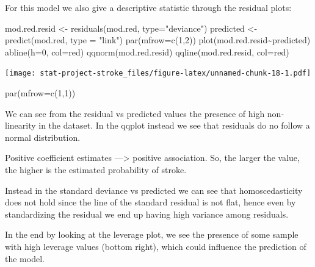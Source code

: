 \documentclass[
]{article}
\newenvironment{Shaded}{\begin{snugshade}}{\end{snugshade}}
\newcommand{\AttributeTok}[1]{\textcolor[rgb]{0.77,0.63,0.00}{#1}}
\newcommand{\DecValTok}[1]{\textcolor[rgb]{0.00,0.00,0.81}{#1}}
\newcommand{\FunctionTok}[1]{\textcolor[rgb]{0.00,0.00,0.00}{#1}}
\newcommand{\NormalTok}[1]{#1}
\newcommand{\OtherTok}[1]{\textcolor[rgb]{0.56,0.35,0.01}{#1}}
\newcommand{\SpecialCharTok}[1]{\textcolor[rgb]{0.00,0.00,0.00}{#1}}
\newcommand{\StringTok}[1]{\textcolor[rgb]{0.31,0.60,0.02}{#1}}
\begin{document}
For this model we also give a descriptive statistic through the residual
plots:

\begin{Shaded}
\begin{Highlighting}[]
\NormalTok{mod.red.resid }\OtherTok{\textless{}{-}} \FunctionTok{residuals}\NormalTok{(mod.red, }\AttributeTok{type=}\StringTok{"deviance"}\NormalTok{)}
\NormalTok{predicted }\OtherTok{\textless{}{-}} \FunctionTok{predict}\NormalTok{(mod.red, }\AttributeTok{type =} \StringTok{"link"}\NormalTok{)}
\FunctionTok{par}\NormalTok{(}\AttributeTok{mfrow=}\FunctionTok{c}\NormalTok{(}\DecValTok{1}\NormalTok{,}\DecValTok{2}\NormalTok{))}
\FunctionTok{plot}\NormalTok{(mod.red.resid}\SpecialCharTok{\textasciitilde{}}\NormalTok{predicted)}
\FunctionTok{abline}\NormalTok{(}\AttributeTok{h=}\DecValTok{0}\NormalTok{, }\AttributeTok{col=}\StringTok{\textquotesingle{}red\textquotesingle{}}\NormalTok{)}
\FunctionTok{qqnorm}\NormalTok{(mod.red.resid)}
\FunctionTok{qqline}\NormalTok{(mod.red.resid, }\AttributeTok{col=}\StringTok{\textquotesingle{}red\textquotesingle{}}\NormalTok{)}
\end{Highlighting}
\end{Shaded}

\texttt{[image: stat-project-stroke\_files/figure-latex/unnamed-chunk-18-1.pdf]}

\begin{Shaded}
\begin{Highlighting}[]
\FunctionTok{par}\NormalTok{(}\AttributeTok{mfrow=}\FunctionTok{c}\NormalTok{(}\DecValTok{1}\NormalTok{,}\DecValTok{1}\NormalTok{))}
\end{Highlighting}
\end{Shaded}

We can see from the residual vs predicted values the presence of high
non-linearity in the dataset. In the qqplot instead we see that
residuals do no follow a normal distribution.

Positive coefficient estimates ---\textgreater{} positive association.
So, the larger the value, the higher is the estimated probability of
stroke.

Instead in the standard deviance vs predicted we can see that
homoscedasticity does not hold since the line of the standard residual
is not flat, hence even by standardizing the residual we end up having
high variance among residuals.

In the end by looking at the leverage plot, we see the presence of some
sample with high leverage values (bottom right), which could influence
the prediction of the model.
\end{document}
